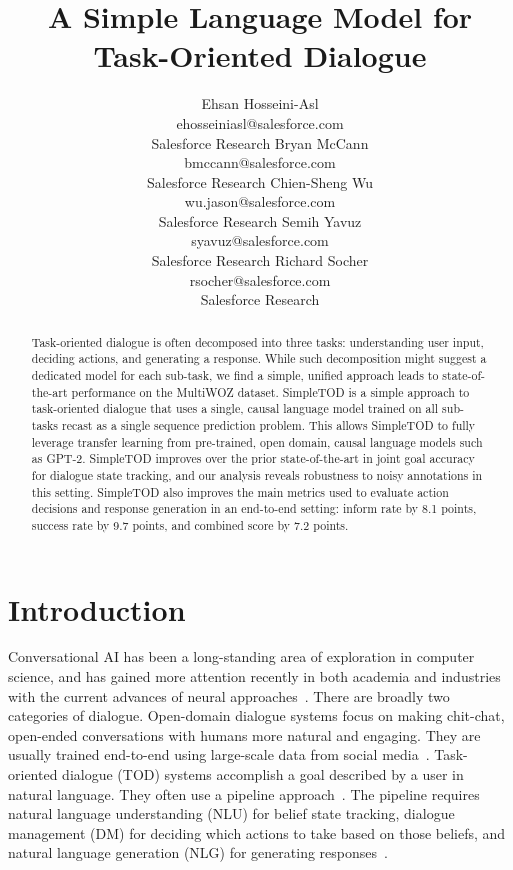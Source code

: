\documentclass{article}
\title{A Simple Language Model for\\ Task-Oriented Dialogue}
\author{Ehsan Hosseini-Asl\\
ehosseiniasl@salesforce.com \\
Salesforce Research
\And 
Bryan McCann\\
bmccann@salesforce.com \\
Salesforce Research
\AND
Chien-Sheng Wu\\
wu.jason@salesforce.com \\
Salesforce Research
\And
Semih Yavuz\\
syavuz@salesforce.com \\
Salesforce Research
\And
Richard Socher\\
rsocher@salesforce.com \\
Salesforce Research
}
\begin{document}
\maketitle

\begin{abstract}
Task-oriented dialogue is often decomposed into three tasks: 
understanding user input, 
deciding actions, and 
generating a response.
While such decomposition might suggest a dedicated model for each sub-task, we find a simple, unified approach leads to state-of-the-art performance 
on the MultiWOZ dataset.
SimpleTOD is a simple approach to task-oriented dialogue that uses a single, causal language model trained on all sub-tasks recast as a single sequence prediction problem.
This allows SimpleTOD to fully leverage transfer learning from pre-trained, open domain, causal language models such as GPT-2. 
SimpleTOD improves over the prior state-of-the-art
in joint goal accuracy for dialogue state tracking, and our analysis reveals robustness to noisy annotations in this setting.
SimpleTOD also improves the main metrics used to evaluate action decisions and response generation in an end-to-end setting:
inform rate by 8.1 points, success rate by 9.7 points, and combined score by 7.2 points. 


\end{abstract} \section{Introduction}
\label{sec:introduction}



Conversational AI has been a long-standing area of exploration in computer science, 
and has gained more attention recently in both academia and industries 
with the current advances of neural approaches~\citep{gao2019neural}.
There are broadly two categories of dialogue. 
Open-domain dialogue systems focus on making chit-chat,
open-ended conversations with humans more natural and engaging.
They are usually trained end-to-end using large-scale data from social media~\citep{meena2020adiwardana}. 
Task-oriented dialogue (TOD) systems accomplish a goal described by a user in natural language.
They often use a pipeline approach~\citep{smith1994spoken, young2013pomdb}.
The pipeline requires natural language understanding (NLU) for belief state tracking, 
dialogue management (DM) for deciding which actions to take based on those beliefs, 
and natural language generation (NLG) for generating responses~\citep{wen2016network}.
\end{document}
